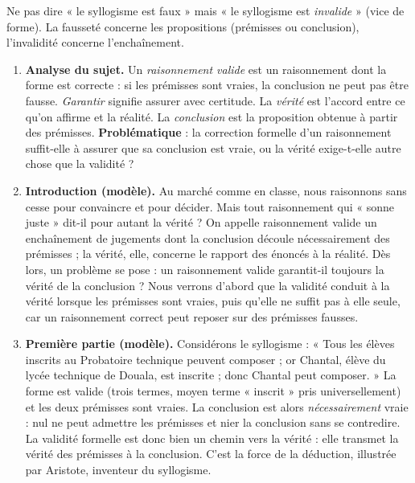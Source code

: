 \documentclass[11pt]{article}
\begin{document}
\begin{attention}
Ne pas dire « le syllogisme est faux » mais « le syllogisme est \emph{invalide} » (vice de forme). La fausseté concerne les propositions (prémisses ou conclusion), l'invalidité concerne l'enchaînement.
\end{attention}

\begin{corrige}
\begin{enumerate}
\item \textbf{Analyse du sujet.} Un \emph{raisonnement valide} est un raisonnement dont la forme est correcte : si les prémisses sont vraies, la conclusion ne peut pas être fausse. \emph{Garantir} signifie assurer avec certitude. La \emph{vérité} est l'accord entre ce qu'on affirme et la réalité. La \emph{conclusion} est la proposition obtenue à partir des prémisses. \textbf{Problématique} : la correction formelle d'un raisonnement suffit-elle à assurer que sa conclusion est vraie, ou la vérité exige-t-elle autre chose que la validité ?
\item \textbf{Introduction (modèle).} Au marché comme en classe, nous raisonnons sans cesse pour convaincre et pour décider. Mais tout raisonnement qui « sonne juste » dit-il pour autant la vérité ? On appelle raisonnement valide un enchaînement de jugements dont la conclusion découle nécessairement des prémisses ; la vérité, elle, concerne le rapport des énoncés à la réalité. Dès lors, un problème se pose : un raisonnement valide garantit-il toujours la vérité de la conclusion ? Nous verrons d'abord que la validité conduit à la vérité lorsque les prémisses sont vraies, puis qu'elle ne suffit pas à elle seule, car un raisonnement correct peut reposer sur des prémisses fausses.
\item \textbf{Première partie (modèle).} Considérons le syllogisme : « Tous les élèves inscrits au Probatoire technique peuvent composer ; or Chantal, élève du lycée technique de Douala, est inscrite ; donc Chantal peut composer. » La forme est valide (trois termes, moyen terme « inscrit » pris universellement) et les deux prémisses sont vraies. La conclusion est alors \emph{nécessairement} vraie : nul ne peut admettre les prémisses et nier la conclusion sans se contredire. La validité formelle est donc bien un chemin vers la vérité : elle transmet la vérité des prémisses à la conclusion. C'est la force de la déduction, illustrée par Aristote, inventeur du syllogisme.

\end{enumerate}
\end{corrige}
\end{document}

